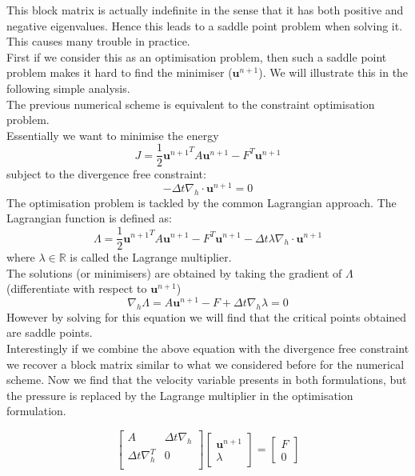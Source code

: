 This block matrix is actually indefinite in the sense that it has both positive and negative eigenvalues. Hence this leads to a saddle point problem when solving it. This causes many trouble in practice.\\

First if we consider this as an optimisation problem, then such a saddle point problem makes it hard to find the minimiser ($\textbf{u}^{n+1}$). We will illustrate this in the following simple analysis.\\

The previous numerical scheme is equivalent to the constraint optimisation problem.\\
Essentially we want to minimise the energy 
\begin{equation*}
J = \dfrac{1}{2}{\textbf{u}^{n+1}}^T A\textbf{u}^{n+1} - F^T\textbf{u}^{n+1}
\end{equation*}
subject to the divergence free constraint:
\begin{equation*}
-\Delta t \nabla_h \cdot \textbf{u}^{n+1} = 0
\end{equation*}
The optimisation problem is tackled by the common Lagrangian approach. The Lagrangian function is defined as:
\begin{equation*}
\Lambda = \dfrac{1}{2}{\textbf{u}^{n+1}}^T A\textbf{u}^{n+1} - F^T\textbf{u}^{n+1} - \Delta t \lambda \nabla_h \cdot \textbf{u}^{n+1} 
\end{equation*}
where $\lambda \in \mathbb{R}$ is called the Lagrange multiplier.\\

The solutions (or minimisers) are obtained by taking the gradient of $\Lambda$ (differentiate with respect to $\textbf{u}^{n+1}$)
\begin{equation*}
\nabla_h \Lambda =  A\textbf{u}^{n+1} - F +  \Delta t \nabla_h \lambda = 0
\end{equation*}
However by solving for this equation we will find that the critical points obtained are saddle points.\\

Interestingly if we combine the above equation with the divergence free constraint we recover a block matrix similar to what we considered before for the numerical scheme. Now we find that the velocity variable presents in both formulations, but the pressure is replaced by the Lagrange multiplier in the optimisation formulation.

\begin{equation}
\begin{bmatrix}
A & \Delta t \nabla_h\\
\Delta t \nabla_h^T & 0 \\
\end{bmatrix}
\begin{bmatrix}
\textbf{u}^{n+1}\\
\lambda
\end{bmatrix}
= \begin{bmatrix}
F\\
0
\end{bmatrix}
\end{equation}

